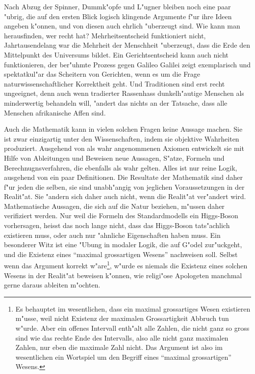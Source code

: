 Nach Abzug der Spinner, Dummk"opfe und L"ugner bleiben noch eine
paar "ubrig, die auf den ersten Blick logisch klingende Argumente
f"ur ihre Ideen angeben k"onnen, und von diesen auch ehrlich 
"uberzeugt sind.
Wie kann man herausfinden, wer recht hat?
Mehrheitsentscheid funktioniert nicht, Jahrtausendelang war
die Mehrheit der Menschheit "uberzeugt, dass die Erde den Mittelpunkt
des Universums bildet.
Ein Gerichtsentscheid kann auch nicht funktionieren, der ber"uhmte
Prozess gegen Galileo Galilei zeigt exemplarisch und spektatkul"ar
das Scheitern von Gerichten, wenn es um die Frage naturwissenschaftlicher
Korrektheit geht.
Und Traditionen sind erst recht ungeeignet, denn auch wenn tradierter Rassenhass
dunkelh"autige Menschen als minderwertig behandeln will, "andert das
nichts an der Tatsache, dass alle Menschen afrikanische Affen sind.

Auch die Mathematik kann in vielen solchen Fragen keine Aussage machen.
Sie ist zwar einzigartig unter den Wissenschaften, indem
sie objektive Wahrheiten produziert.
Ausgehend von als wahr angenommenen Axiomen entwickelt sie mit 
Hilfe von Ableitungen und Beweisen neue Aussagen, S"atze, Formeln
und Berechnugnsverfahren, die ebenfalls als wahr gelten.
Alles ist nur reine Logik, ausgehend von ein paar Definitionen.
Die Resultate der Mathematik sind daher f"ur jeden die selben, 
sie sind unabh"angig von jeglichen Voraussetzungen in der Realit"at.
Sie "andern sich daher auch nicht, wenn die Realit"at ver"andert wird.
Mathematische Aussagen, die sich auf die Natur beziehen, m"ussen daher
verifiziert werden.
Nur weil die Formeln des Standardmodells ein Higgs-Boson vorhersagen,
heisst das noch lange nicht, dass das Higgs-Boson tats"achlich existieren
muss, oder auch nur "ahnliche Eigenschaften haben muss.
Ein besonderer Witz ist eine "Ubung in modaler Logik, die auf G"odel
zur"uckgeht, und die Existenz eines ``maximal grossartigen Wesens'' 
nachweisen soll. 
Selbst wenn das Argument korrekt w"are\footnote{Es behauptet im wesentlichen,
dass ein maximal grossartiges Wesen existieren m"usse, weil nicht Existenz
der maximalen Grossartigkeit Abbruch tun w"urde.
Aber ein offenes Intervall enth"alt alle Zahlen, die nicht ganz so gross
sind wie das rechte Ende des Intervalls, also alle nicht ganz maximalen
Zahlen, nur eben die maximale Zahl nicht.
Das Argument ist also im wesentlichen ein Wortspiel um den Begriff eines
``maximal grossartigen'' Wesens.}, w"urde es niemals die Existenz eines
solchen Wesens in der Realit"at beweisen k"onnen, wie religi"ose
Apologeten manchmal gerne daraus ableiten m"ochten.

